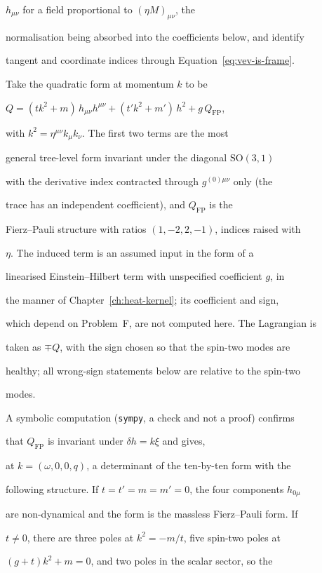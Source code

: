 \(h_{\mu\nu}\) for a field proportional to \((\eta M)_{\mu\nu}\), the

normalisation being absorbed into the coefficients below, and identify

tangent and coordinate indices through Equation~\eqref{eq:vev-is-frame}.

Take the quadratic form at momentum \(k\) to be

\(Q=(tk^2+m)\,h_{\mu\nu}h^{\mu\nu}+(t'k^2+m')\,h^2+g\,Q_{\mathrm{FP}}\),

with \(k^2=\eta^{\mu\nu}k_\mu k_\nu\).  The first two terms are the most

general tree-level form invariant under the diagonal \(\mathrm{SO}(3,1)\)

with the derivative index contracted through \(g^{(0)\mu\nu}\) only (the

trace has an independent coefficient), and \(Q_{\mathrm{FP}}\) is the

Fierz--Pauli structure with ratios \((1,-2,2,-1)\), indices raised with

\(\eta\).  The induced term is an assumed input in the form of a

linearised Einstein--Hilbert term with unspecified coefficient \(g\), in

the manner of Chapter~\ref{ch:heat-kernel}; its coefficient and sign,

which depend on Problem~F, are not computed here.  The Lagrangian is

taken as \(\mp Q\), with the sign chosen so that the spin-two modes are

healthy; all wrong-sign statements below are relative to the spin-two

modes.



A symbolic computation (\texttt{sympy}, a check and not a proof) confirms

that \(Q_{\mathrm{FP}}\) is invariant under \(\delta h=k\xi\) and gives,

at \(k=(\omega,0,0,q)\), a determinant of the ten-by-ten form with the

following structure.  If \(t=t'=m=m'=0\), the four components \(h_{0\mu}\)

are non-dynamical and the form is the massless Fierz--Pauli form.  If

\(t\neq0\), there are three poles at \(k^2=-m/t\), five spin-two poles at

\((g+t)k^2+m=0\), and two poles in the scalar sector, so the

